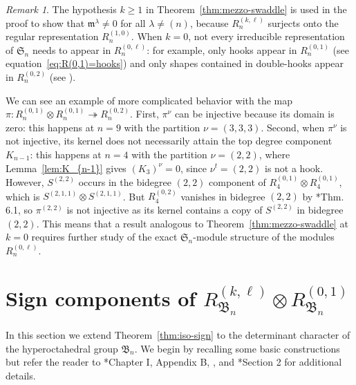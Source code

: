 \documentclass[11pt, reqno]{amsart}
\theoremstyle{definition}
\theoremstyle{remark}
\newtheorem{remark}[theorem]{Remark}
\numberwithin{equation}{section}
\newcommand{\0}{\emptyset}
\renewcommand{\S}{\mathfrak{S}}
\begin{document}
\begin{remark}\label{rem:k0}
    The hypothesis $k \geq 1$ in Theorem~\ref{thm:mezzo-swaddle} is used in the proof to show that $\mathfrak{m}^\lambda \neq 0$ for all $\lambda \neq (n)$, because $R_n^{(k,\ell)}$ surjects onto the regular representation $R_n^{(1,0)}$.
    When $k=0$, not every irreducible representation of $\S_n$ needs to appear in $R_n^{(0,\ell)}$: for example, only hooks appear in $R_n^{(0,1)}$ (see equation~\eqref{eq:R(0,1)=hooks}) and only shapes contained in double-hooks appear in $R_n^{(0,2)}$ (see \cites{KimRhoades2022, Lentfer2025, Rosas}).

    We can see an example of more complicated behavior with the map $\pi: R_n^{(0,1)} \otimes R_n^{(0,1)} \twoheadrightarrow R_n^{(0,2)}$.
    First, $\pi^\nu$ can be injective because its domain is zero: this happens at $n=9$ with the partition $\nu = (3,3,3)$.
    Second, when $\pi^\nu$ is not injective, its kernel does not necessarily attain the top degree component $K_{n-1}$: this happens at $n=4$ with the partition $\nu = (2,2)$, where Lemma~\ref{lem:K_{n-1}} gives $(K_3)^\nu = 0$, since $\nu^t = (2,2)$ is not a hook.
    However, $S^{(2,2)}$ occurs in the bidegree $(2,2)$ component of 
    $R_4^{(0,1)} \otimes R_4^{(0,1)}$, which is $S^{(2,1,1)} \otimes S^{(2,1,1)}$. 
    But $R_4^{(0,2)}$ vanishes in bidegree $(2,2)$ by \cite{KimRhoades2022}*{Thm. 6.1}, so $\pi^{(2,2)}$ is not injective as its kernel contains a copy of $S^{(2,2)}$ in bidegree $(2,2)$. 
    This means that a result analogous to Theorem~\ref{thm:mezzo-swaddle} at $k=0$ requires further study of the exact $\S_n$-module structure of the modules $R_n^{(0,\ell)}$. 
\end{remark}

\section{Sign components of \texorpdfstring{$R_{\mathfrak{B}_n}^{(k,\ell)} \otimes R_{\mathfrak{B}_n}^{(0,1)}$}{RBn(k,l)xRBn(0,1)}}\label{sec:type-B}

In this section we extend Theorem~\ref{thm:iso-sign} to the determinant character of the hyperoctahedral group $\mathfrak{B}_n$. We begin by recalling some basic constructions but refer the reader to  \cite{Macdonald}*{Chapter I, Appendix B}, \cite{GeckPfeiffer}, and \cite{JiangLentfer}*{Section 2} for additional details.
\end{document}
